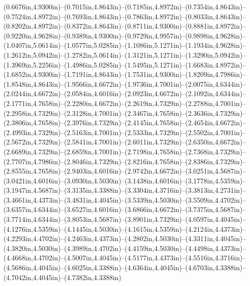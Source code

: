 (0.6676in,4.9300in)--(0.7015in,4.8643in)--(0.7185in,4.8972in)--(0.7354in,4.8643in)--(0.7524in,4.8972in)--(0.7693in,4.8643in)--(0.7863in,4.8972in)--(0.8033in,4.8643in)--(0.8202in,4.8972in)--(0.8372in,4.8643in)--(0.8711in,4.9300in)--(0.8881in,4.8972in)--(0.9220in,4.9628in)--(0.9389in,4.9300in)--(0.9729in,4.9957in)--(0.9898in,4.9628in)--(1.0407in,5.0614in)--(1.0577in,5.0285in)--(1.1086in,5.1271in)--(1.1934in,4.9628in)--(1.2612in,5.0942in)--(1.2782in,5.0614in)--(1.3121in,5.1271in)--(1.3290in,5.0942in)--(1.3969in,5.2256in)--(1.4986in,5.0285in)--(1.5495in,5.1271in)--(1.6683in,4.8972in)--(1.6852in,4.9300in)--(1.7191in,4.8643in)--(1.7531in,4.9300in)--(1.8209in,4.7986in)--(1.8548in,4.8643in)--(1.9566in,4.6672in)--(1.9736in,4.7001in)--(2.0075in,4.6344in)--(2.0244in,4.6672in)--(2.0584in,4.6016in)--(2.0923in,4.6672in)--(2.1092in,4.6344in)--(2.1771in,4.7658in)--(2.2280in,4.6672in)--(2.2619in,4.7329in)--(2.2788in,4.7001in)--(2.2958in,4.7329in)--(2.3128in,4.7001in)--(2.3467in,4.7658in)--(2.3636in,4.7329in)--(2.3806in,4.7658in)--(2.3976in,4.7329in)--(2.4145in,4.7658in)--(2.4654in,4.6672in)--(2.4993in,4.7329in)--(2.5163in,4.7001in)--(2.5333in,4.7329in)--(2.5502in,4.7001in)--(2.5672in,4.7329in)--(2.5841in,4.7001in)--(2.6011in,4.7329in)--(2.6350in,4.6672in)--(2.6689in,4.7329in)--(2.6859in,4.7001in)--(2.7198in,4.7658in)--(2.7368in,4.7329in)--(2.7707in,4.7986in)--(2.8046in,4.7329in)--(2.8216in,4.7658in)--(2.8386in,4.7329in)--(2.8555in,4.7658in)--(2.9403in,4.6016in)--(2.9742in,4.6672in)--(3.0251in,4.5687in)--(3.0421in,4.6016in)--(3.0930in,4.5030in)--(3.1438in,4.6016in)--(3.1778in,4.5359in)--(3.1947in,4.5687in)--(3.3135in,4.3388in)--(3.3304in,4.3716in)--(3.3813in,4.2731in)--(3.4661in,4.4373in)--(3.4831in,4.4045in)--(3.5339in,4.5030in)--(3.5509in,4.4702in)--(3.6357in,4.6344in)--(3.6527in,4.6016in)--(3.6866in,4.6672in)--(3.7375in,4.5687in)--(3.7714in,4.6344in)--(3.8053in,4.5687in)--(3.8901in,4.7329in)--(4.0597in,4.4045in)--(4.1276in,4.5359in)--(4.1445in,4.5030in)--(4.1615in,4.5359in)--(4.2124in,4.4373in)--(4.2293in,4.4702in)--(4.2463in,4.4373in)--(4.2802in,4.5030in)--(4.3311in,4.4045in)--(4.3820in,4.5030in)--(4.3989in,4.4702in)--(4.4159in,4.5030in)--(4.4498in,4.4373in)--(4.4668in,4.4702in)--(4.5007in,4.4045in)--(4.5177in,4.4373in)--(4.5516in,4.3716in)--(4.5686in,4.4045in)--(4.6025in,4.3388in)--(4.6364in,4.4045in)--(4.6703in,4.3388in)--(4.7042in,4.4045in)--(4.7382in,4.3388in)
